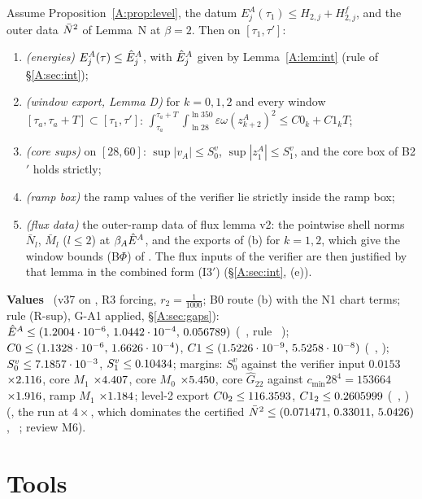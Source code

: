 \documentclass[11pt]{article}
\begin{document}
\begin{theorem}\label{A:thm:A}
Assume Proposition~\ref{A:prop:level}, the datum $E^A_j(\tau_1)\le H_{2,j}+H^f_{2,j}$, and the outer data $\bar N^2$ of Lemma~N at $\beta=2$. Then on $[\tau_1,\tau']$:
\begin{enumerate}[label=(\alph*),leftmargin=2em]
\item \emph{(energies)} $E^A_j(\tau)\le\hat E^A_j$, with $\hat E^A_j$ given by Lemma~\ref{A:lem:int} (rule of \S\ref{A:sec:int});
\item \emph{(window export, Lemma D)} for $k=0,1,2$ and every window $[\tau_a,\tau_a+T]\subset[\tau_1,\tau']$: $\int_{\tau_a}^{\tau_a+T}\!\int_{\ln28}^{\ln350}\varepsilon\omega(z^A_{k+2})^2\le C0_k+C1_kT$;
\item \emph{(core sups)} on $[28,60]$: $\sup|v_A|\le S^v_0$, $\sup|z^A_1|\le S^v_1$, and the core box of B2$'$ holds strictly;
\item \emph{(ramp box)} the ramp values of the verifier lie strictly inside the ramp box;
\item \emph{(flux data)} the outer-ramp data of flux lemma v2: the pointwise shell norms $\bar N_l$, $\bar M_l$ ($l\le2$) at $\beta_A\hat E^A$, and the exports of (b) for $k=1,2$, which give the window bounds (B$\Phi$) of . The flux inputs of the verifier are then justified by that lemma in the combined form (I3$'$) (\S\ref{A:sec:int}, (e)).
\end{enumerate}
\textbf{Values} \tC\ (v37 on , R3 forcing, $r_2=\frac1{1000}$; B0 route (b) with the N1 chart terms; rule (R-sup), G-A1 applied, \S\ref{A:sec:gaps}): $\hat E^A\le(1.2004\cdot10^{-6},\,1.0442\cdot10^{-4},\,0.056789)$ (\SU\ , rule \SA\ ); $C0\le(1.1328\cdot10^{-6},\,1.6626\cdot10^{-4})$, $C1\le(1.5226\cdot10^{-9},\,5.5258\cdot10^{-8})$ (\SU\ , ); $S^v_0\le7.1857\cdot10^{-3}$, $S^v_1\le0.10434$; margins: $S^v_0$ against the verifier input $0.0153$ $\times2.116$, core $M_1$ $\times4.407$, core $M_0$ $\times5.450$, core $\hat G_{22}$ against $c_{\min}28^4=153664$ $\times1.916$, ramp $M_1$ $\times1.184$; level-2 export $C0_2\le116.3593$, $C1_2\le0.2605999$ (\SA\ , ) (, the run at $4\times$, which dominates the certified $\bar N^2\le(0.071471,\,0.33011,\,5.0426)$, \SU\ ; review M6).
\end{theorem}

\section{Tools}\label{A:sec:tools}
\end{document}
